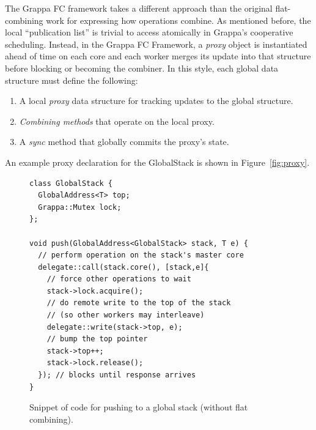 The Grappa FC framework takes a different approach than the original flat-combining work for expressing how operations combine. As mentioned before, the local ``publication list'' is trivial to access atomically in Grappa's cooperative scheduling.
Instead, in the Grappa FC Framework, a \emph{proxy} object is instantiated ahead of time on each core and each worker merges its update into that structure before blocking or becoming the combiner.
In this style, each global data structure must define the following:
\begin{enumerate}
  \item A local \emph{proxy} data structure for tracking updates to the global structure.
  \item \emph{Combining methods} that operate on the local proxy.
  \item A \emph{sync} method that globally commits the proxy's state.
\end{enumerate}
An example proxy declaration for the GlobalStack is shown in Figure~\ref{fig:proxy}.

\begin{figure}[t]
\centering
\begin{lstlisting}[style=grappa]
class GlobalStack {
  GlobalAddress<T> top;
  Grappa::Mutex lock;
};

void push(GlobalAddress<GlobalStack> stack, T e) {
  // perform operation on the stack's master core
  delegate::call(stack.core(), [stack,e]{
    // force other operations to wait
    stack->lock.acquire();
    // do remote write to the top of the stack
    // (so other workers may interleave)
    delegate::write(stack->top, e);
    // bump the top pointer
    stack->top++;
    stack->lock.release();
  }); // blocks until response arrives
}
\end{lstlisting}
\caption{Snippet of code for pushing to a global stack (without flat combining).}
\label{fig:push}
\end{figure}

